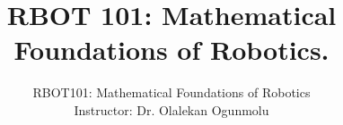 \documentclass[doublespacing]{brandeis}
\author{RBOT101: Mathematical Foundations of  Robotics \\
	Instructor: Dr. Olalekan Ogunmolu}
\title{RBOT 101: Mathematical Foundations of  Robotics.
}
\numberwithin{equation}{section}
\theoremstyle{definition}
\begin{document}
	
	\frontmatter
	
	
	\tableofcontents
	\listoffigures %
	\listoftables %
	
	\mainmatter
%



\newpage





%
%
%
%
%
\providecommand\BIBentryALTinterwordstretchfactor{2.5}

%

\end{document}
